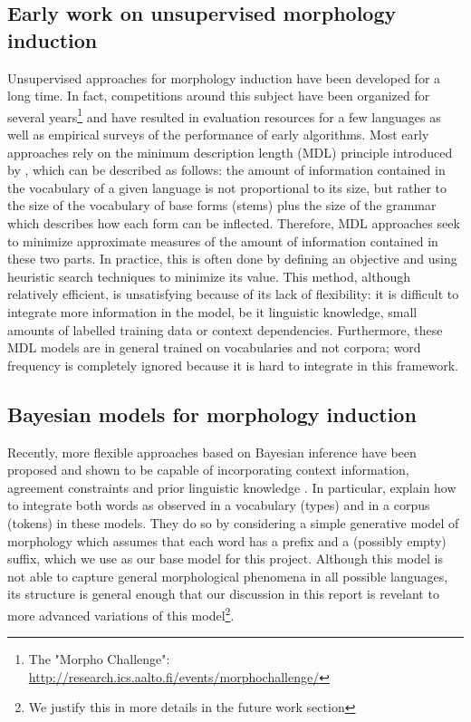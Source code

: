 \subsection{Early work on unsupervised morphology induction}
Unsupervised approaches for morphology induction have been developed for a long time. In fact, competitions around this subject have been organized for several years\footnote{The "Morpho Challenge": \url{http://research.ics.aalto.fi/events/morphochallenge/}} and have resulted in evaluation resources for a few languages as well as empirical surveys of the performance of early algorithms. Most early approaches rely on the minimum description length (MDL) principle introduced by \cite{goldsmith2001}, which can be described as follows: the amount of information contained in the vocabulary of a given language is not proportional to its size, but rather to the size of the vocabulary of base forms (stems) plus the size of the grammar which describes how each form can be inflected. Therefore, MDL approaches seek to minimize approximate measures of the amount of information contained in these two parts. In practice, this is often done by defining an objective and using heuristic search techniques to minimize its value. This method, although relatively efficient, is unsatisfying because of its lack of flexibility: it is difficult to integrate more information in the model, be it linguistic knowledge, small amounts of labelled training data or context dependencies. Furthermore, these MDL models are in general trained on vocabularies and not corpora; word frequency is completely ignored because it is hard to integrate in this framework.

\subsection{Bayesian models for morphology induction}
Recently, more flexible approaches based on Bayesian inference have been proposed and shown to be capable of incorporating context information, agreement constraints \cite{lee2011, sirts2012} and prior linguistic knowledge \cite{chahuneau13}. In particular, \cite{goldwater2011} explain how to integrate both words as observed in a vocabulary (types) and in a corpus (tokens) in these models. They do so by considering a simple generative model of morphology which assumes that each word has a prefix and a (possibly empty) suffix, which we use as our base model for this project. Although this model is not able to capture general morphological phenomena in all possible languages, its structure is general enough that our discussion in this report is revelant to more advanced variations of this model\footnote{We justify this in more details in the future work section}.

